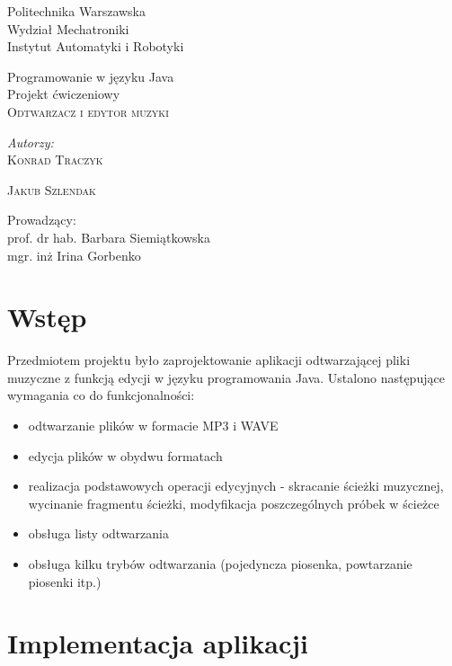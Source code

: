 \documentclass[12pt,a4paper,notitlepage]{article}
\makeatletter
\renewcommand{\maketitle}{\begin{titlepage}

    \vspace*{1cm}

    \begin{center}\small

   	 Politechnika Warszawska\\
    	Wydział Mechatroniki\\
 	Instytut Automatyki i Robotyki
    \end{center}
    \vspace{3cm}


    \begin{center}

	\small
	Programowanie w języku Java \\
	Projekt ćwiczeniowy \\
	
      \LARGE \textsc{Odtwarzacz i edytor muzyki}

         \end{center}


    \vspace{5.5cm}

    \begin{flushright}

    \begin{minipage}{5cm}

    \textit{\small Autorzy:}\\

    \normalsize \textsc{Konrad Traczyk} \par
    \normalsize \textsc{Jakub Szlendak} \par

    \end{minipage}

    \vspace{5cm}

     {\small Prowadzący:}\\
 
         {prof. dr hab. Barbara Siemiątkowska}\\	
         {mgr. inż Irina Gorbenko}

     \end{flushright}

    \vspace*{\stretch{6}}

    \begin{center}

    \@date

    \end{center}

  \end{titlepage}%

}
\makeatother
\begin{document}
\maketitle

\section{Wstęp}

Przedmiotem projektu było zaprojektowanie aplikacji odtwarzającej pliki muzyczne z funkcją edycji w języku programowania Java. Ustalono następujące wymagania co do funkcjonalności:
\begin{itemize}
 \item odtwarzanie plików w formacie MP3 i WAVE
 \item edycja plików w obydwu formatach
 \item realizacja podstawowych operacji edycyjnych - skracanie ścieżki muzycznej, wycinanie fragmentu ścieżki, modyfikacja poszczególnych próbek w ścieżce
 \item obsługa listy odtwarzania
 \item obsługa kilku trybów odtwarzania (pojedyncza piosenka, powtarzanie piosenki itp.)
\end{itemize}

\section{Implementacja aplikacji}
\end{document}
